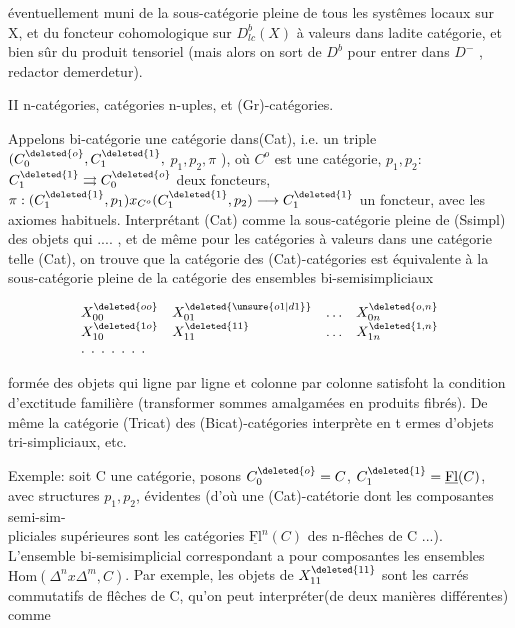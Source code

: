 éventuellement muni de la sous-catégorie pleine de tous les systêmes locaux
sur X, et du foncteur cohomologique sur $D^b_{lc}(X)$ à valeurs dans ladite
catégorie, et bien sûr du produit tensoriel (mais alors on sort de $D^b$
pour entrer dans $D^-$ , redactor demerdetur).

II n-catégories, catégories n-uples, et (Gr)-catégories.

Appelons bi-catégorie une catégorie dans(Cat), i.e. un triple
$(C^{\deleted{o}}_{0},C^{\deleted{1}}_{1},$ $p_1,p_2,\pi$ ), où $C^o$ est une catégorie, $p_1,p_2$: $C^{\deleted{1}}_{1}\rightrightarrows C^{\deleted{o}}_{0}$ deux
foncteurs, $\pi:(C^{\deleted{1}}_{1},p_1)x_{C^o}(C^{\deleted{1}}_{1},p_2)\longrightarrow C^{\deleted{1}}_{1}$ un foncteur, avec les axiomes
habituels. Interprétant (Cat) comme la sous-catégorie pleine de (Ssimpl)
des objets qui .... , et de même pour les catégories à valeurs dans une
catégorie telle (Cat), on trouve que la catégorie  des (Cat)-catégories
est équivalente à la sous-catégorie pleine de la catégorie des ensembles
bi-semisimpliciaux

\[
\begin{array}{llll}
X^{\deleted{oo}}_{00} & X^{\deleted{\unsure{o1|d1}}}_{01} & \ldots & X^{\deleted{o,n}}_{0n}\\
X^{\deleted{1o}}_{10} & X^{\deleted{11}}_{11} & \ldots & X^{\deleted{1,n}}_{1n}\\
\multicolumn{4}{l}{\ldotp\;\ldotp\;\ldotp\;\ldotp\;\ldotp\;\ldotp\;\ldotp}
\end{array}
\]

formée des objets qui ligne par ligne et colonne par colonne satisfoht la
condition d'exctitude familière (transformer sommes amalgamées en produits
fibrés). De même la catégorie  (Tricat) des (Bicat)-catégories
interprète en t ermes d'objets tri-simpliciaux, etc.

Exemple: soit C une catégorie, posons $C^{\deleted{o}}_{0}=C$, $C^{\deleted{1}}_{1}=\underline{\mathrm{Fl}}(C)$, avec structures
$p_1,p_2$, évidentes (d'où une (Cat)-catétorie dont les composantes semi-sim-\\
pliciales supérieures sont les catégories $\underline{\mathrm{Fl}}^n(C)$ des n-flêches de C ...).
L'ensemble bi-semisimplicial correspondant a pour composantes les ensembles
$\mathrm{Hom}(\Delta^n x\Delta^m,C)$. Par exemple, les objets de $X^{\deleted{11}}_{11}$ sont les carrés commutatifs
de flêches de C, qu'on peut interpréter(de deux manières différentes) comme

